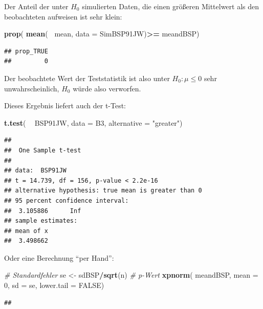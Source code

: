 \documentclass[12pt,ngerman,paper=a4,pagesize,DIV=13]{scrreprt}
\newenvironment{Shaded}{\begin{snugshade}}{\end{snugshade}}
\newcommand{\CommentTok}[1]{\textcolor[rgb]{0.56,0.35,0.01}{\textit{#1}}}
\newcommand{\DataTypeTok}[1]{\textcolor[rgb]{0.13,0.29,0.53}{#1}}
\newcommand{\DecValTok}[1]{\textcolor[rgb]{0.00,0.00,0.81}{#1}}
\newcommand{\KeywordTok}[1]{\textcolor[rgb]{0.13,0.29,0.53}{\textbf{#1}}}
\newcommand{\NormalTok}[1]{#1}
\newcommand{\OperatorTok}[1]{\textcolor[rgb]{0.81,0.36,0.00}{\textbf{#1}}}
\newcommand{\OtherTok}[1]{\textcolor[rgb]{0.56,0.35,0.01}{#1}}
\newcommand{\StringTok}[1]{\textcolor[rgb]{0.31,0.60,0.02}{#1}}
\begin{document}
Der Anteil der unter \(H_0\) simulierten Daten, die einen größeren
Mittelwert als den beobachteten aufweisen ist sehr klein:

\begin{Shaded}
\begin{Highlighting}[]
\KeywordTok{prop}\NormalTok{( }\KeywordTok{mean}\NormalTok{( }\OperatorTok{~}\NormalTok{mean, }\DataTypeTok{data =}\NormalTok{ SimBSP91JW)}\OperatorTok{>=}\StringTok{ }\NormalTok{meandBSP)}
\end{Highlighting}
\end{Shaded}

\begin{verbatim}
## prop_TRUE 
##         0
\end{verbatim}

Der beobachtete Wert der Teststatistik ist also unter
\(H_0: \mu \leq 0\) sehr unwahrscheinlich, \(H_0\) würde also verworfen.

Dieses Ergebnis liefert auch der t-Test:

\begin{Shaded}
\begin{Highlighting}[]
\KeywordTok{t.test}\NormalTok{( }\OperatorTok{~}\StringTok{ }\NormalTok{BSP91JW, }\DataTypeTok{data =}\NormalTok{ B3, }\DataTypeTok{alternative =} \StringTok{"greater"}\NormalTok{)}
\end{Highlighting}
\end{Shaded}

\begin{verbatim}
## 
##  One Sample t-test
## 
## data:  BSP91JW
## t = 14.739, df = 156, p-value < 2.2e-16
## alternative hypothesis: true mean is greater than 0
## 95 percent confidence interval:
##  3.105886      Inf
## sample estimates:
## mean of x 
##  3.498662
\end{verbatim}

Oder eine Berechnung \enquote{per Hand}:

\begin{Shaded}
\begin{Highlighting}[]
\CommentTok{# Standardfehler}
\NormalTok{se <-}\StringTok{ }\NormalTok{sdBSP}\OperatorTok{/}\KeywordTok{sqrt}\NormalTok{(n)}
\CommentTok{# p-Wert}
\KeywordTok{xpnorm}\NormalTok{( meandBSP, }\DataTypeTok{mean =} \DecValTok{0}\NormalTok{, }\DataTypeTok{sd =}\NormalTok{ se, }\DataTypeTok{lower.tail =} \OtherTok{FALSE}\NormalTok{)}
\end{Highlighting}
\end{Shaded}

\begin{verbatim}
## 
\end{verbatim}
\end{document}
